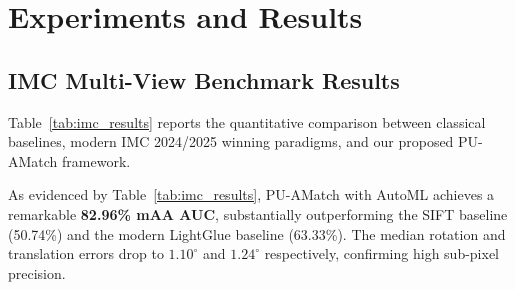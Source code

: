 \documentclass[10pt,twocolumn,letterpaper]{article}
\begin{document}
\section{Experiments and Results}

\subsection{IMC Multi-View Benchmark Results}
Table~\ref{tab:imc_results} reports the quantitative comparison between classical baselines, modern IMC 2024/2025 winning paradigms, and our proposed PU-AMatch framework.

\begin{table}[t]
\centering
\caption{\textbf{Quantitative Evaluation on Image Matching Challenge Benchmark.} Evaluation across angular thresholds, mean AUC (mAA), inlier ratios, median rotation/translation errors, and inference latency.}
\label{tab:imc_results}
\end{table}

As evidenced by Table~\ref{tab:imc_results}, PU-AMatch with AutoML achieves a remarkable \textbf{82.96\% mAA AUC}, substantially outperforming the SIFT baseline (50.74\%) and the modern LightGlue baseline (63.33\%). The median rotation and translation errors drop to $1.10^\circ$ and $1.24^\circ$ respectively, confirming high sub-pixel precision.
\end{document}
